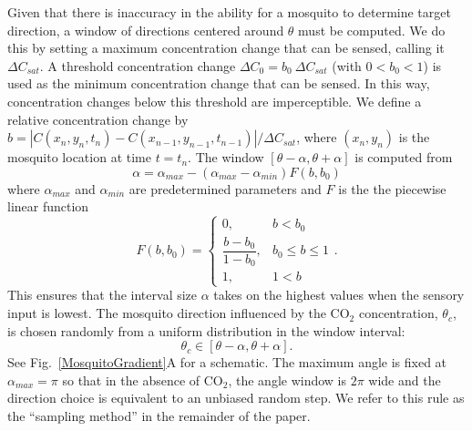 \documentclass[10pt]{article}
\begin{document}
Given that there is inaccuracy in the ability for a mosquito to determine target direction, 
a window of directions centered around $\theta$ must 
be computed.  We do this by setting a maximum concentration
change that can be sensed, calling it $\Delta C_{sat}$.  
A threshold concentration change $\Delta C_0 = b_0\ \Delta C_{sat}$
(with $0<b_0<1$) is used as the minimum concentration change that can be sensed.  In this way, 
concentration changes below this threshold are imperceptible.  We define a relative concentration 
change by $b = |C(x_n,y_n,t_n)-C(x_{n-1},y_{n-1},t_{n-1})|/\Delta C_{sat}$,
where $(x_n,y_n)$ is the mosquito location at time $t=t_n$.
%
The window $[\theta-\alpha,\theta+\alpha]$ is computed from
\begin{equation} \label{eqn:response}
\alpha = \alpha_{max} - (\alpha_{max}-\alpha_{min}) F(b,b_0)
\end{equation}
where $\alpha_{max}$ and $\alpha_{min}$ are predetermined parameters and $F$ is the
the piecewise linear function
\begin{equation}
F(b, b_0) = \left\{ \begin{array}{lr}
   0, & b < b_0 \\
   \dfrac{b-b_0}{1 - b_0}, & b_0 \leq b \leq 1 \\
   1, & 1 < b
   \end{array}\right. . \label{eqn:functional}
 \end{equation}
This ensures that the interval size $\alpha$ takes on the highest values when the sensory input is lowest. 
The mosquito direction influenced by the CO$_2$ concentration, $\theta_c$, is chosen randomly from a uniform distribution in the window interval: 
\begin{equation}
	\theta_c \in [\theta-\alpha,\theta+\alpha].\label{eqn:thetac}
\end{equation}
See Fig.~\ref{MosquitoGradient}A for a schematic. The maximum angle is fixed at $\alpha_{max} =\pi$ so that in the absence of CO$_2$, the angle window 
is $2\pi$ wide and the direction choice is equivalent to an unbiased random step.
We refer to this rule as the ``sampling method'' in the remainder of the paper.

\end{document}
